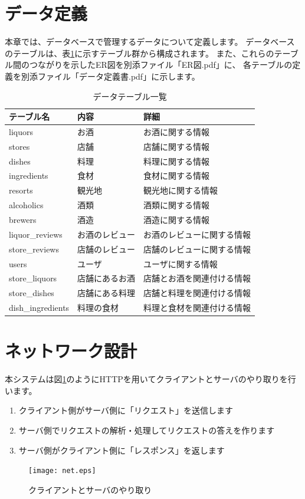 \documentclass[a4j,titlepage]{jarticle}
\begin{document}
\newpage
\section{データ定義}
本章では、データベースで管理するデータについて定義します。
データベースのテーブルは、表\ref{tables}に示すテーブル群から構成されます。
また、これらのテーブル間のつながりを示したER図を別添ファイル「ER図.pdf」に、
各テーブルの定義を別添ファイル「データ定義書.pdf」に示します。
​
\begin{table}[!htbp]
\caption{データテーブル一覧}
\label{tables}
\begin{center}
\begin{tabular}{|l|l|l|}\hline
テーブル名 & 内容 & 詳細\\\hline\hline
liquors & お酒 & お酒に関する情報\\\hline
stores & 店舗 & 店舗に関する情報\\\hline
dishes & 料理 & 料理に関する情報\\\hline
ingredients & 食材 & 食材に関する情報\\\hline
resorts & 観光地 & 観光地に関する情報\\\hline
alcoholics & 酒類 & 酒類に関する情報\\\hline
brewers & 酒造 & 酒造に関する情報\\\hline
liquor\_reviews & お酒のレビュー & お酒のレビューに関する情報\\\hline
store\_reviews & 店舗のレビュー & 店舗のレビューに関する情報\\\hline
users & ユーザ & ユーザに関する情報\\\hline
store\_liquors & 店舗にあるお酒 & 店舗とお酒を関連付ける情報\\\hline
store\_dishes & 店舗にある料理 & 店舗と料理を関連付ける情報\\\hline
dish\_ingredients & 料理の食材 & 料理と食材を関連付ける情報\\\hline
\end{tabular}
\end{center}
\end{table}

\section{ネットワーク設計}
本システムは図\ref{net}のようにHTTPを用いてクライアントとサーバのやり取りを行います。
\begin{enumerate}
  \item クライアント側がサーバ側に「リクエスト」を送信します
  \item サーバ側でリクエストの解析・処理してリクエストの答えを作ります
  \item サーバ側がクライアント側に「レスポンス」を返します
\end{enumerate}
\begin{figure}[h]
  \begin{center}
    \texttt{[image: net.eps]}
    \caption{クライアントとサーバのやり取り}
    \label{net}
  \end{center}
\end{figure}
\end{document}
